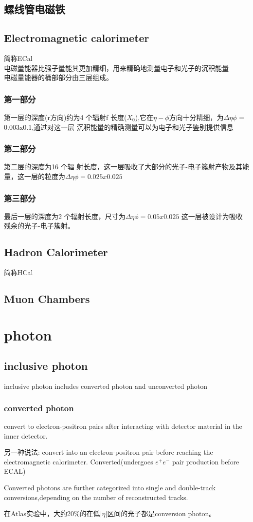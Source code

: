 \documentclass{ctexart}
\begin{document}
\subsection{螺线管电磁铁}
\subsection{Electromagnetic calorimeter}
简称ECal\\
电磁量能器比强子量能其更加精细，用来精确地测量电子和光子的沉积能量\\
电磁量能器的桶部部分由三层组成。
\subsubsection{第一部分}
第⼀层的深度(r⽅向)约为4 个辐射f
长度($X_0$),它在$\eta-\phi$方向⼗分精细，为$\Delta\eta\phi$ = 0.003x0.1,通过对这⼀层
沉积能量的精确测量可以为电⼦和光⼦鉴别提供信息
\subsubsection{第二部分}
第⼆层的深度为16 个辐
射长度，这⼀层吸收了⼤部分的光⼦-电⼦簇射产物及其能量，这⼀层的粒度为$\Delta\eta\phi=0.025x0.025$
\subsubsection{第三部分}
最后⼀层的深度为2 个辐射长度，尺⼨为$\Delta\eta\phi=0.05x0.025$
这⼀层被设计为吸收残余的光⼦-电⼦簇射。
\subsection{Hadron Calorimeter}
简称HCal
\subsection{Muon Chambers}
\section{photon}
\subsection{inclusive photon}
inclusive photon includes converted photon and unconverted photon

\subsubsection{converted photon}
convert to electron-positron pairs after interacting with detector material in the inner detector.\par
另一种说法: convert into an electron-positron pair before reaching the electromagnetic calorimeter.
Converted(undergoes $e^+e^-$ pair production before ECAL)\par
Converted photons are further categorized into single and double-track conversions,depending on the number of reconstructed tracks.\par
在Atlas实验中，大约20\%的在低$|\eta|$区间的光子都是conversion photon。
\end{document}
